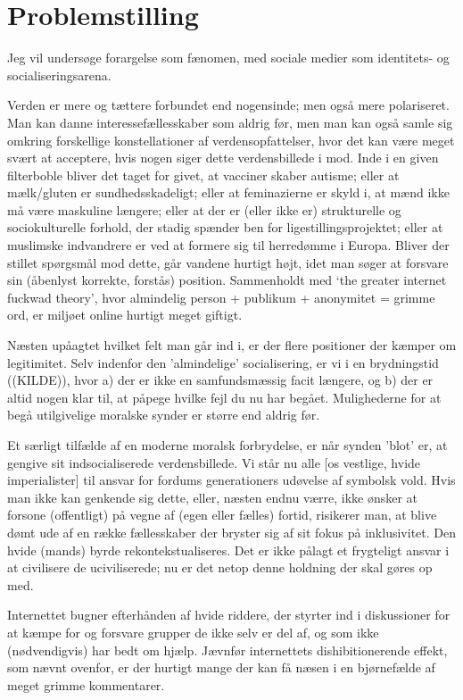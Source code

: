 \section{Problemstilling}

Jeg vil undersøge forargelse som fænomen, med sociale medier som
identitets- og socialiseringsarena.

Verden er mere og tættere forbundet end nogensinde; men også mere
polariseret. Man kan danne interessefællesskaber som aldrig før, men man
kan også samle sig omkring forskellige konstellationer af
verdensopfattelser, hvor det kan være meget svært at acceptere, hvis nogen
siger dette verdensbillede i mod. Inde i en given filterboble bliver det
taget for givet, at vacciner skaber autisme; eller at mælk/gluten er
sundhedsskadeligt; eller at feminazierne er skyld i, at mænd ikke må være
maskuline længere; eller at der er (eller ikke er) strukturelle og
sociokulturelle forhold, der stadig spænder ben for
ligestillingsprojektet; eller at muslimske indvandrere er ved at formere
sig til herredømme i Europa. Bliver der stillet spørgsmål mod dette, går
vandene hurtigt højt, idet man søger at forsvare sin (åbenlyst korrekte,
forstås) position. Sammenholdt med ‘the greater internet fuckwad theory’,
hvor almindelig person + publikum + anonymitet = grimme ord, er miljøet
online hurtigt meget giftigt.

Næsten upåagtet hvilket felt man går ind i, er der flere positioner der
kæmper om legitimitet. Selv indenfor den 'almindelige' socialisering, er
vi i en brydningstid ((KILDE)), hvor a) der er ikke en samfundsmæssig
facit længere, og b) der er altid nogen klar til, at påpege hvilke fejl du
nu har begået. Mulighederne for at begå utilgivelige moralske synder er
større end aldrig før. 

Et særligt tilfælde af en moderne moralsk forbrydelse, er når synden
'blot' er, at gengive sit indsocialiserede verdensbillede. Vi står nu alle
[os vestlige, hvide imperialister] til ansvar for fordums generationers
udøvelse af symbolsk vold. Hvis man ikke kan genkende sig dette, eller,
næsten endnu værre, ikke ønsker at forsone (offentligt) på vegne af (egen
eller fælles) fortid, risikerer man, at blive dømt ude af en række
fællesskaber der bryster sig af sit fokus på inklusivitet. Den hvide
(mands) byrde rekontekstualiseres. Det er ikke pålagt et frygteligt ansvar
i at civilisere de uciviliserede; nu er det netop denne holdning der skal
gøres op med.

Internettet bugner efterhånden af hvide riddere, der styrter ind
i diskussioner for at kæmpe for og forsvare grupper de ikke selv er del
af, og som ikke (nødvendigvis) har bedt om hjælp. Jævnfør internettets
dishibitionerende effekt, som nævnt ovenfor, er der hurtigt mange der kan
få næsen i en bjørnefælde af meget grimme kommentarer.

